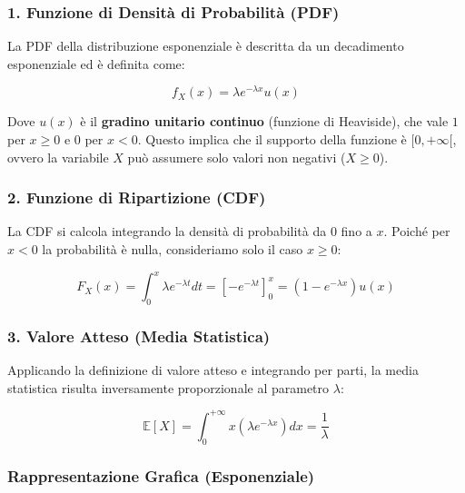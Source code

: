 \subsubsection{1. Funzione di Densità di Probabilità (PDF)}
La PDF della distribuzione esponenziale è descritta da un decadimento esponenziale ed è definita come:

\begin{equation}
f_X(x) = \lambda e^{-\lambda x} u(x)
\end{equation}

Dove $u(x)$ è il \textbf{gradino unitario continuo} (funzione di Heaviside), che vale $1$ per $x \ge 0$ e $0$ per $x < 0$. Questo implica che il supporto della funzione è $[0, +\infty[$, ovvero la variabile $X$ può assumere solo valori non negativi ($X \ge 0$).

\subsubsection{2. Funzione di Ripartizione (CDF)}
La CDF si calcola integrando la densità di probabilità da $0$ fino a $x$. Poiché per $x < 0$ la probabilità è nulla, consideriamo solo il caso $x \ge 0$:

\begin{equation}
F_X(x) = \int_{0}^{x} \lambda e^{-\lambda t} dt = \left[ -e^{-\lambda t} \right]_{0}^{x} = (1 - e^{-\lambda x}) u(x)
\end{equation}

\subsubsection{3. Valore Atteso (Media Statistica)}
Applicando la definizione di valore atteso e integrando per parti, la media statistica risulta inversamente proporzionale al parametro $\lambda$:

\begin{equation}
\mathbb{E}[X] = \int_{0}^{+\infty} x \left(\lambda e^{-\lambda x}\right) dx = \frac{1}{\lambda}
\end{equation}

\subsubsection{Rappresentazione Grafica (Esponenziale)}

